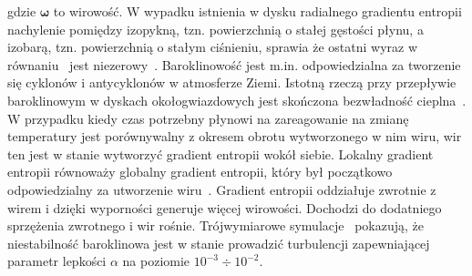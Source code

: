 gdzie $\mathbf{\omega}$ to wirowość. 
W wypadku istnienia w dysku radialnego gradientu entropii nachylenie pomiędzy izopykną,
tzn. powierzchnią o stałej gęstości płynu, a izobarą, tzn. powierzchnią o
stałym ciśnieniu, sprawia że ostatni wyraz w równaniu~ jest
niezerowy~\cite{LK11}. Baroklinowość jest m.in. odpowiedzialna za tworzenie się
cyklonów i antycyklonów w atmosferze Ziemi. Istotną rzeczą przy przepływie
baroklinowym w dyskach okołogwiazdowych jest skończona bezwładność
cieplna~\cite{P07a, P07b}. W przypadku kiedy czas potrzebny płynowi na
zareagowanie na zmianę temperatury jest porównywalny z okresem obrotu
wytworzonego w nim wiru, wir ten jest w stanie wytworzyć gradient entropii wokół
siebie. Lokalny gradient entropii równoważy globalny gradient entropii, który
był początkowo odpowiedzialny za utworzenie wiru~\cite{KB03}. Gradient entropii
oddziałuje zwrotnie z wirem i dzięki wyporności generuje więcej wirowości.
Dochodzi do dodatniego sprzężenia zwrotnego i wir rośnie. Trójwymiarowe
symulacje~\cite{KB03} pokazują, że niestabilność baroklinowa jest w stanie
prowadzić turbulencji zapewniającej parametr lepkości $\alpha$ na poziomie
$10^{-3}\div10^{-2}$.

